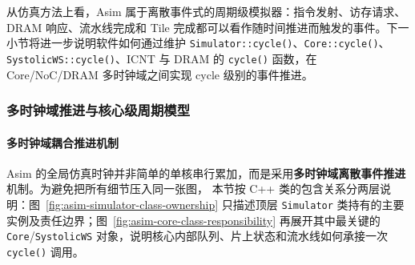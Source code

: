 \documentclass{CjC}
\begin{document}
    从仿真方法上看，Asim 属于离散事件式的周期级模拟器：指令发射、访存请求、DRAM
    响应、流水线完成和 Tile 完成都可以看作随时间推进而触发的事件。下一小节将进一步说明软件如何通过维护
    \texttt{Simulator::cycle()}、\texttt{Core::cycle()}、\texttt{SystolicWS::cycle()}、ICNT
    与 DRAM 的 \texttt{cycle()} 函数，在 Core/NoC/DRAM 多时钟域之间实现 cycle 级别的事件推进。

    \subsubsection{多时钟域推进与核心级周期模型}

    \paragraph{多时钟域耦合推进机制}
    Asim 的全局仿真时钟并非简单的单核串行累加，而是采用\textbf{多时钟域离散事件推进}机制。为避免把所有细节压入同一张图，
    本节按 C++ 类的包含关系分两层说明：图~\ref{fig:asim-simulator-class-ownership} 只描述顶层
    \texttt{Simulator} 类持有的主要实例及责任边界；图~\ref{fig:asim-core-class-responsibility}
    再展开其中最关键的 \texttt{Core}/\texttt{SystolicWS} 对象，说明核心内部队列、片上状态和流水线如何承接一次
    \texttt{cycle()} 调用。
\end{document}

